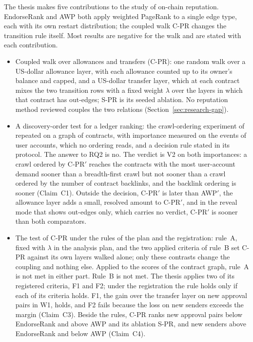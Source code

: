 The thesis makes five contributions to the study of on-chain reputation. EndorseRank and AWP both apply weighted PageRank \parencite{page1999pagerank} to a single edge type, each with its own restart distribution; the coupled walk \mbox{C-PR} changes the transition rule itself. Most results are negative for the walk and are stated with each contribution.
\begin{itemize}
\item Coupled walk over allowances and transfers (\mbox{C-PR}): one random walk over a US-dollar allowance layer, with each allowance counted up to its owner's balance and capped, and a US-dollar transfer layer, which at each contract mixes the two transition rows with a fixed weight $\lambda$ over the layers in which that contract has out-edges; \mbox{S-PR} is its seeded ablation. No reputation method reviewed couples the two relations (Section~\ref{sec:research-gap}).
\item A discovery-order test for a ledger ranking: the crawl-ordering experiment of \textcite{cho1998crawling} repeated on a graph of contracts, with importance measured on the events of user accounts, which no ordering reads, and a decision rule stated in its protocol. The answer to RQ2 is no. The verdict is V2 on both importances: a crawl ordered by \mbox{C-PR}$'$ reaches the contracts with the most user-account demand sooner than a breadth-first crawl but not sooner than a crawl ordered by the number of contract backlinks, and the backlink ordering is sooner (Claim~C1). Outside the decision, \mbox{C-PR}$'$ is later than AWP$'$, the allowance layer adds a small, resolved amount to \mbox{C-PR}$'$, and in the reveal mode that shows out-edges only, which carries no verdict, \mbox{C-PR}$'$ is sooner than both comparators.
\item The test of \mbox{C-PR} under the rules of the plan and the registration: rule~A, fixed with $\lambda$ in the analysis plan, and the two applied criteria of rule~B set \mbox{C-PR} against its own layers walked alone; only these contrasts change the coupling and nothing else. Applied to the scores of the contract graph, rule~A is not met in either part. Rule~B is not met. The thesis applies two of its registered criteria, F1 and F2; under the registration the rule holds only if each of its criteria holds. F1, the gain over the transfer layer on new approval pairs in W1, holds, and F2 fails because the loss on new senders exceeds the margin (Claim~C3). Beside the rules, \mbox{C-PR} ranks new approval pairs below EndorseRank and above AWP and its ablation \mbox{S-PR}, and new senders above EndorseRank and below AWP (Claim~C4).

\end{itemize}
